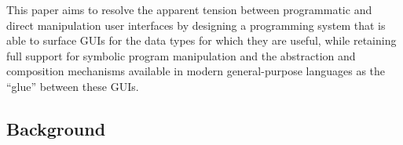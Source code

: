 
This paper aims to resolve the apparent tension between
programmatic and direct manipulation user interfaces by designing a programming system that
is able to surface GUIs for the data types for which
they are useful, while retaining full support for symbolic program manipulation
and the abstraction and composition mechanisms
available in modern general-purpose languages as the ``glue'' between these 
GUIs.

\subsection{Background}
